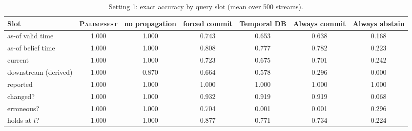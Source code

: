 \begin{table}[t]\centering\small
\caption{Setting 1: exact accuracy by query slot (mean over 500 streams).}\label{tab:slots}
\begin{tabular}{lcccccc}
\toprule
Slot & \textsc{Palimpsest} & no propagation & forced commit & Temporal DB & Always commit & Always abstain \\
\midrule
as-of valid time & 1.000 & 1.000 & 0.743 & 0.653 & 0.638 & 0.168 \\
as-of belief time & 1.000 & 1.000 & 0.808 & 0.777 & 0.782 & 0.223 \\
current & 1.000 & 1.000 & 0.723 & 0.675 & 0.701 & 0.242 \\
downstream (derived) & 1.000 & 0.870 & 0.664 & 0.578 & 0.296 & 0.000 \\
reported & 1.000 & 1.000 & 1.000 & 1.000 & 1.000 & 1.000 \\
changed? & 1.000 & 1.000 & 0.932 & 0.919 & 0.919 & 0.068 \\
erroneous? & 1.000 & 1.000 & 0.704 & 0.001 & 0.001 & 0.296 \\
holds at $t$? & 1.000 & 1.000 & 0.877 & 0.771 & 0.734 & 0.224 \\
\bottomrule
\end{tabular}
\end{table}